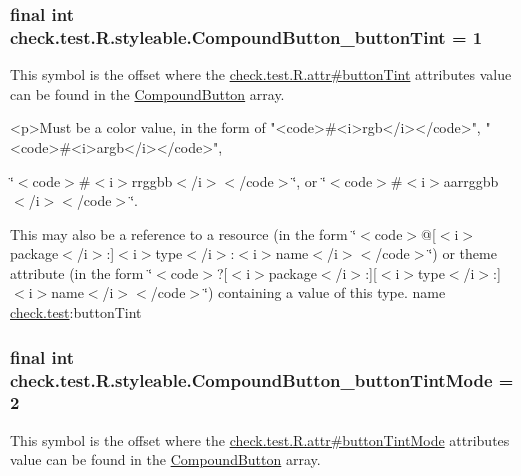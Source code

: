 \subsubsection[{Compound\+Button\+\_\+button\+Tint}]{\setlength{\rightskip}{0pt plus 5cm}final int check.\+test.\+R.\+styleable.\+Compound\+Button\+\_\+button\+Tint = 1\hspace{0.3cm}{\ttfamily [static]}}\label{classcheck_1_1test_1_1_r_1_1styleable_abeac4e31561aff11337ba066d51e4a89}
This symbol is the offset where the \hyperlink{classcheck_1_1test_1_1_r_1_1attr_ae0edaceba06f9362a37080dd1f7d7822}{check.\+test.\+R.\+attr\#button\+Tint} attribute\textquotesingle{}s value can be found in the \hyperlink{classcheck_1_1test_1_1_r_1_1styleable_a92450249dab865f0e8cb180e69be8dcf}{Compound\+Button} array.

\begin{DoxyVerb}      <p>Must be a color value, in the form of "<code>#<i>rgb</i></code>", "<code>#<i>argb</i></code>",
\end{DoxyVerb}
 \char`\"{}$<$code$>$\#$<$i$>$rrggbb$<$/i$>$$<$/code$>$\char`\"{}, or \char`\"{}$<$code$>$\#$<$i$>$aarrggbb$<$/i$>$$<$/code$>$\char`\"{}. 

This may also be a reference to a resource (in the form \char`\"{}$<$code$>$@\mbox{[}$<$i$>$package$<$/i$>$\+:\mbox{]}$<$i$>$type$<$/i$>$\+:$<$i$>$name$<$/i$>$$<$/code$>$\char`\"{}) or theme attribute (in the form \char`\"{}$<$code$>$?\mbox{[}$<$i$>$package$<$/i$>$\+:\mbox{]}\mbox{[}$<$i$>$type$<$/i$>$\+:\mbox{]}$<$i$>$name$<$/i$>$$<$/code$>$\char`\"{}) containing a value of this type.  name \hyperlink{namespacecheck_1_1test}{check.\+test}\+:button\+Tint \hypertarget{classcheck_1_1test_1_1_r_1_1styleable_a0c860185874a6d4eb945c0ff3ab04d68}{}
\subsubsection[{Compound\+Button\+\_\+button\+Tint\+Mode}]{\setlength{\rightskip}{0pt plus 5cm}final int check.\+test.\+R.\+styleable.\+Compound\+Button\+\_\+button\+Tint\+Mode = 2\hspace{0.3cm}{\ttfamily [static]}}\label{classcheck_1_1test_1_1_r_1_1styleable_a0c860185874a6d4eb945c0ff3ab04d68}
This symbol is the offset where the \hyperlink{classcheck_1_1test_1_1_r_1_1attr_ac70c44b347889c97d7002237d7a591d3}{check.\+test.\+R.\+attr\#button\+Tint\+Mode} attribute\textquotesingle{}s value can be found in the \hyperlink{classcheck_1_1test_1_1_r_1_1styleable_a92450249dab865f0e8cb180e69be8dcf}{Compound\+Button} array.

